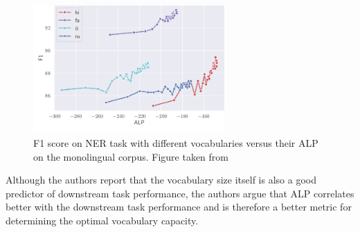 
\begin{figure}[h]
    \centering
    \includegraphics[width=0.65\textwidth]{img/temp/alp_vs_NER.png}
    \caption{F1 score on NER task with different vocabularies versus their ALP on the monolingual corpus. Figure taken from \cite{zheng_allocating_2021}}
    \label{fig:alp_vs_NER}
\end{figure}

Although the authors report that the vocabulary size itself is also a good predictor of downstream task performance, the authors argue that ALP correlates better with the downstream task performance and is therefore a better metric for determining the optimal vocabulary capacity.


